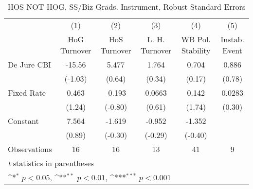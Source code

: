 \begin{table}[htbp]\centering
\def\sym#1{\ifmmode^{#1}\else\(^{#1}\)\fi}
\caption{HOS NOT HOG, SS/Biz Grads. Instrument, Robust Standard Errors \label{NOhoshogIfivs3}}
\begin{tabular}{l*{5}{c}}
\toprule
                                        &\multicolumn{1}{c}{(1)}&\multicolumn{1}{c}{(2)}&\multicolumn{1}{c}{(3)}&\multicolumn{1}{c}{(4)}&\multicolumn{1}{c}{(5)}\\
                                        &\multicolumn{1}{c}{HoG Turnover}&\multicolumn{1}{c}{HoS Turnover}&\multicolumn{1}{c}{L. H. Turnover}&\multicolumn{1}{c}{WB Pol. Stability}&\multicolumn{1}{c}{Instab. Event}\\
\midrule
De Jure CBI                             &   -15.56         &    5.477         &    1.764         &    0.704         &    0.886         \\
                                        &  (-1.03)         &   (0.64)         &   (0.34)         &   (0.17)         &   (0.78)         \\
\addlinespace
Fixed Rate                              &    0.463         &   -0.193         &   0.0663         &    0.142         &   0.0283         \\
                                        &   (1.24)         &  (-0.80)         &   (0.61)         &   (1.74)         &   (0.30)         \\
\addlinespace
Constant                                &    7.564         &   -1.619         &   -0.952         &   -1.352         &                  \\
                                        &   (0.89)         &  (-0.30)         &  (-0.29)         &  (-0.40)         &                  \\
\midrule
Observations                            &       16         &       16         &       13         &       41         &        9         \\
\bottomrule
\multicolumn{6}{l}{\footnotesize \textit{t} statistics in parentheses}\\
\multicolumn{6}{l}{\footnotesize \sym{*} \(p<0.05\), \sym{**} \(p<0.01\), \sym{***} \(p<0.001\)}\\
\end{tabular}
\end{table}
